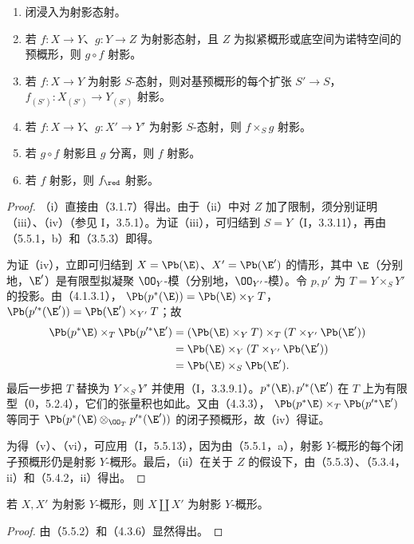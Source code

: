 \begin{enumerate}[label=\textup{(\roman*)}]
\item 闭浸入为射影态射。
\item 若 $f:X\to Y$、$g:Y\to Z$ 为射影态射，且 $Z$ 为拟紧概形或底空间为诺特空间的预概形，则 $g\circ f$ 射影。
\item 若 $f:X\to Y$ 为射影 $S$-态射，则对基预概形的每个扩张 $S'\to S$，$f_{(S')}:X_{(S')}\to Y_{(S')}$ 射影。
\item 若 $f:X\to Y$、$g:X'\to Y'$ 为射影 $S$-态射，则 $f\times_Sg$ 射影。
\item 若 $g\circ f$ 射影且 $g$ 分离，则 $f$ 射影。
\item 若 $f$ 射影，则 $f_{\red}$ 射影。
\end{enumerate}
\begin{proof}
（i）直接由（3.1.7）得出。由于（ii）中对 $Z$ 加了限制，须分别证明（iii）、（iv）（参见 I，3.5.1）。为证（iii），可归结到 $S=Y$（I，3.3.11），再由（5.5.1，b）和（3.5.3）即得。

为证（iv），立即可归结到 $X=\Pb(\E)$、$X'=\Pb(\E')$ 的情形，其中 $\E$（分别地，$\E'$）是有限型拟凝聚 $\OO_Y$-模（分别地，$\OO_{Y'}$-模）。令 $p,p'$ 为 $T=Y\times_S Y'$ 的投影。由（4.1.3.1），
$\Pb(p^*(\E))=\Pb(\E)\times_Y T$，$\Pb(p'^*(\E'))=\Pb(\E')\times_{Y'}T$；故
\[
\begin{aligned}
\Pb(p^*\E)\times_T\Pb(p'^*\E')
&=(\Pb(\E)\times_Y T)\times_T(T\times_{Y'}\Pb(\E'))\\
&=\Pb(\E)\times_Y(T\times_{Y'}\Pb(\E'))\\
&=\Pb(\E)\times_S\Pb(\E').
\end{aligned}
\]
最后一步把 $T$ 替换为 $Y\times_S Y'$ 并使用（I，3.3.9.1）。$p^*(\E),p'^*(\E')$ 在 $T$ 上为有限型（0，5.2.4），它们的张量积也如此。又由（4.3.3），
$\Pb(p^*\E)\times_T\Pb(p'^*\E')$ 等同于
$\Pb(p^*(\E)\otimes_{\OO_T}p'^*(\E'))$ 的闭子预概形，故（iv）得证。

为得（v）、（vi），可应用（I，5.5.13），因为由（5.5.1，a），射影 $Y$-概形的每个闭子预概形仍是射影 $Y$-概形。最后，（ii）在关于 $Z$ 的假设下，由（5.5.3）、（5.3.4，ii）和（5.4.2，ii）得出。
\end{proof}

若 $X,X'$ 为射影 $Y$-概形，则 $X\amalg X'$ 为射影 $Y$-概形。
\begin{proof}
由（5.5.2）和（4.3.6）显然得出。
\end{proof}

